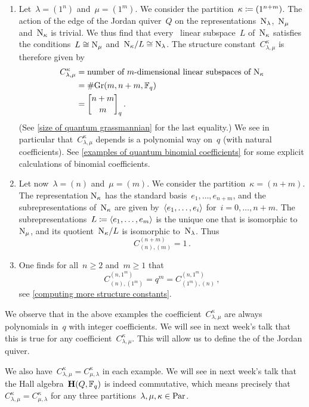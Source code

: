 \documentclass[a4paper,11pt]{scrartcl}
\begin{document}
\begin{example}
  \leavevmode
  \begin{enumerate}
    \item
      Let~$\lambda = (1^n)$ and~$\mu = (1^m)$.
      We consider the partition~$\kappa \coloneqq (1^{n+m})$.
      The action of the edge of the Jordan quiver~$Q$ on the representations~$\mathrm{N}_\lambda$,~$\mathrm{N}_\mu$ and~$\mathrm{N}_\kappa$ is trivial.
      We thus find that every~ linear subspace~$L$ of~$\mathrm{N}_{\kappa}$ satisfies the conditions~$L \cong \mathrm{N}_\mu$ and~$\mathrm{N}_\kappa / L \cong \mathrm{N}_\lambda$.
      The structure constant~$C^{\kappa}_{\lambda, \mu}$ is therefore given by
      \begin{align*}
        C^{\kappa}_{\lambda, \mu}
        &=
        \text{number of~\dimensional{$m$} linear subspaces of~$\Nil_{\kappa}$}
        \\
        &=
        \counting {\Gr(m, n+m, \Finite_q)}
        \\
        &=
        \qbinom{n+m}{m}_q \,.
      \end{align*}
      (See \cref{size of quantum grassmannian} for the last equality.)
      We see in particular that~$C^{\kappa}_{\lambda, \mu}$ depends is a polynomial way on~$q$ (with natural coefficients). 
      See \cref{examples of quantum binomial coefficients} for some explicit calculations of binomial coefficients.
    \item
      Let now~$\lambda = (n)$ and~$\mu = (m)$.
      We consider the partition~$\kappa = (n+m)$. 
      The representation$~\mathrm{N}_{\kappa}$ has the standard basis~$e_1, \dotsc, e_{n+m}$, and the subrepresentations of~$\mathrm{N}_{\kappa}$ are given by~$\langle e_1, \dotsc, e_i\rangle$ for~$i = 0, \dotsc, n+m$.
      The subrepresentations~$L \coloneqq \langle e_1, \dotsc, e_m\rangle$ is the unique one that is isomorphic to~$\mathrm{N}_\mu$, and its quotient~$\mathrm{N}_\kappa / L$ is isomorphic to~$\mathrm{N}_\lambda$.
      Thus
      \[
        C^{(n+m)}_{(n),(m)}
        =
        1 \,.
      \]
    \item
      One finds for all~$n \geq 2$ and~$m \geq 1$ that
      \[
        C^{(n, 1^m)}_{(n), (1^m)}
        =
        q^m
        =
        C^{(n, 1^m)}_{(1^m), (n)} \,,
      \]
      see \cref{computing more structure constants}.
  \end{enumerate}
  We observe that in the above examples the coefficient~$C^{\kappa}_{\lambda, \mu}$ are always polynomials in~$q$ with integer coefficients.
  We will see in next week’s talk that this is true for any coefficient~$C^{\kappa}_{\lambda, \mu}$.
  This will allow us to define the  of the Jordan quiver.

  We also have~$C^{\kappa}_{\lambda, \mu} = C^{\kappa}_{\mu, \lambda}$ in each example.
  We will see in next week’s talk that the Hall algebra~$\mathbf{H}(Q, \mathbb{F}_q)$ is indeed commutative, which means precisely that~$C^\kappa_{\lambda, \mu} = C^\kappa_{\mu, \lambda}$ for any three partitions~$\lambda, \mu, \kappa \in \mathrm{Par}$.
\end{example}
\end{document}
